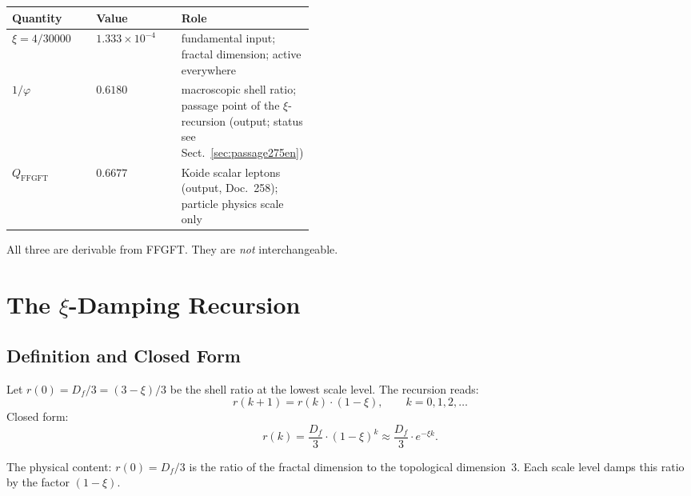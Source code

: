 \begin{definition}\label{def:scalars275en}
\begin{center}
\begin{tabular}{@{}llp{0.44\linewidth}@{}}
\toprule
Quantity & Value & Role \\
\midrule
$\xi = 4/30000$ & $1.333\times10^{-4}$ &
  fundamental input; fractal dimension; active everywhere \\
$1/\varphi$ & $0.6180$ &
  macroscopic shell ratio; passage point of the $\xi$-recursion (output; status see Sect.~\ref{sec:passage275en}) \\
$Q_\mathrm{FFGFT}$ & $0.6677$ &
  Koide scalar leptons (output, Doc.~258); particle physics scale only \\
\bottomrule
\end{tabular}
\end{center}
All three are derivable from FFGFT. They are \emph{not} interchangeable.
\end{definition}

\section{The $\xi$-Damping Recursion}

\subsection{Definition and Closed Form}

\begin{definition}\label{def:rec275en}
Let $r(0) = D_f/3 = (3-\xi)/3$ be the shell ratio at the lowest scale level.
The recursion reads:
\begin{equation}
  r(k+1) = r(k)\cdot(1-\xi), \qquad k = 0,1,2,\ldots
  \label{eq:rec275en}
\end{equation}
Closed form:
\begin{equation}
  r(k) = \frac{D_f}{3}\cdot(1-\xi)^k \approx \frac{D_f}{3}\cdot e^{-\xi k}.
  \label{eq:closed275en}
\end{equation}
\end{definition}

The physical content: $r(0) = D_f/3$ is the ratio of the fractal
dimension to the topological dimension~3. Each scale level damps this
ratio by the factor $(1-\xi)$.


